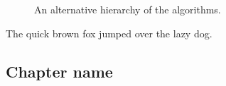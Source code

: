 \documentclass{l4proj}
\begin{document}
\begin{figure}
\centering
\vspace{-30mm}
\caption{An alternative hierarchy of the algorithms.}
\label{uroborus}
\end{figure}

The quick brown fox jumped over the lazy dog.

\begin{appendices}

\chapter{Chapter name}
\begin{verbatim}
\end{verbatim}

\end{appendices}




\end{document}

